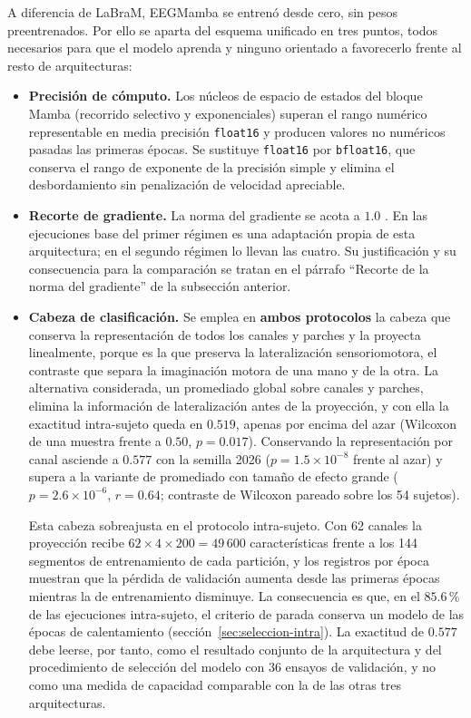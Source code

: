 A diferencia de LaBraM, EEGMamba se entrenó desde cero, sin pesos preentrenados.
Por ello se aparta del esquema unificado en tres puntos, todos necesarios para que
el modelo aprenda y ninguno orientado a favorecerlo frente al resto de
arquitecturas:

\begin{itemize}
  \item \textbf{Precisión de cómputo.} Los núcleos de espacio de estados del
  bloque Mamba (recorrido selectivo y exponenciales) superan el rango numérico
  representable en media precisión \texttt{float16} y producen valores no numéricos pasadas las primeras
  épocas. Se sustituye \texttt{float16} por \texttt{bfloat16}, que conserva el
  rango de exponente de la precisión simple y elimina el desbordamiento sin
  penalización de velocidad apreciable.
  \item \textbf{Recorte de gradiente.} La norma del gradiente se acota a $1.0$
  \cite{pascanu2013difficulty}. En las ejecuciones base del primer régimen es una
  adaptación propia de esta arquitectura; en el segundo régimen lo llevan las cuatro. Su
  justificación y su consecuencia para la comparación se tratan en el párrafo ``Recorte de
  la norma del gradiente'' de la subsección anterior.
  \item \textbf{Cabeza de clasificación.} Se emplea en \textbf{ambos protocolos} la
  cabeza que conserva la representación de todos los canales y parches y la proyecta
  linealmente, porque es la que preserva la lateralización sensoriomotora, el contraste
  que separa la imaginación motora de una mano y de la otra. La alternativa considerada,
  un promediado global sobre canales y parches, elimina la información de lateralización antes de la
  proyección, y con ella la exactitud intra-sujeto queda en $0.519$, apenas por encima
  del azar (Wilcoxon de una muestra frente a $0.50$, $p = 0.017$). Conservando la
  representación por canal asciende a $0.577$ con la semilla 2026 ($p = 1.5\times10^{-8}$ frente al azar) y
  supera a la variante de promediado con tamaño de efecto grande
  ($p = 2.6\times10^{-6}$, $r = 0.64$; contraste de Wilcoxon pareado sobre los 54
  sujetos).

  Esta cabeza sobreajusta en el protocolo intra-sujeto. Con 62 canales la proyección
  recibe $62 \times 4 \times 200 = 49\,600$ características frente a los 144 segmentos de
  entrenamiento de cada partición, y los registros por época muestran que la pérdida de
  validación aumenta desde las primeras épocas mientras la de entrenamiento disminuye.
  La consecuencia es que, en el $85.6$\,\% de las ejecuciones intra-sujeto, el criterio de
  parada conserva un modelo de las épocas de calentamiento
  (sección~\ref{sec:seleccion-intra}). La exactitud de $0.577$ debe leerse, por tanto,
  como el resultado conjunto de la arquitectura y del procedimiento de selección del
  modelo con 36 ensayos de validación, y no como una medida de capacidad comparable con
  la de las otras tres arquitecturas.
\end{itemize}

